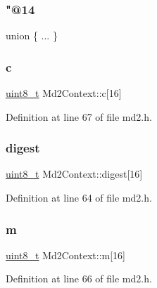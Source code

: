 \subsubsection{\texorpdfstring{"@14}{@14}}
{\footnotesize\ttfamily union \{ ... \} }

\mbox{\label{structMd2Context_abefd310eb88918040e120d90d2869256}} 
\subsubsection{\texorpdfstring{c}{c}}
{\footnotesize\ttfamily \hyperlink{stdint_8h_aba7bc1797add20fe3efdf37ced1182c5}{uint8\+\_\+t} Md2\+Context\+::c\mbox{[}16\mbox{]}}



Definition at line 67 of file md2.\+h.

\mbox{\label{structMd2Context_abbf42a8e93b5e5f22636477a6efa361a}} 
\subsubsection{\texorpdfstring{digest}{digest}}
{\footnotesize\ttfamily \hyperlink{stdint_8h_aba7bc1797add20fe3efdf37ced1182c5}{uint8\+\_\+t} Md2\+Context\+::digest\mbox{[}16\mbox{]}}



Definition at line 64 of file md2.\+h.

\mbox{\label{structMd2Context_a2e9be22ee68833109610d431d0ec7752}} 
\subsubsection{\texorpdfstring{m}{m}}
{\footnotesize\ttfamily \hyperlink{stdint_8h_aba7bc1797add20fe3efdf37ced1182c5}{uint8\+\_\+t} Md2\+Context\+::m\mbox{[}16\mbox{]}}



Definition at line 66 of file md2.\+h.

\mbox{\label{structMd2Context_a257b9952c3fd0ad1c5fcc27c2883aa2f}} 
